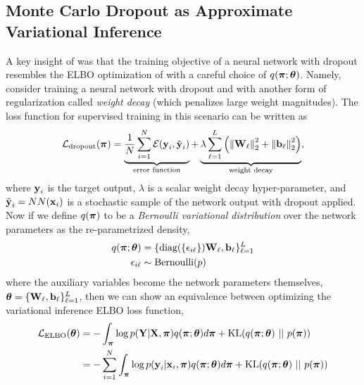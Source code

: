 \subsection{Monte Carlo Dropout as Approximate Variational Inference}
A key insight of \cite{Gal2016UncertaintyThesis, Gal2016-ny} was that the training objective of a neural network with dropout resembles the ELBO optimization of  with a careful choice of $q(\boldsymbol{\mathbf{\pi}}; \boldsymbol{\mathbf{\theta}})$.
Namely, consider training a neural network with dropout and with another form of regularization called \textit{weight decay} (which penalizes large weight magnitudes). The loss function for supervised training in this scenario can be written as
\begin{equation}
\label{eq:sun_bcnn_dropout_obj}
\mathcal{L}_{\text{dropout}}(\boldsymbol{\mathbf{\pi}}) = \underbrace{\frac{1}{N} \sum_{i=1}^N \mathcal{E}(\boldsymbol{\mathbf{y}}_i, \tilde{\boldsymbol{\mathbf{y}}}_i)}_{\text{error function}} + \underbrace{\lambda \sum_{\ell=1}^L	\left( \left\Vert\boldsymbol{\mathbf{W}}_\ell\right\Vert_2^2 +  \left\Vert\boldsymbol{\mathbf{b}}_\ell\right\Vert_2^2\right)}_{\text{weight decay}},
\end{equation}
where $\boldsymbol{\mathbf{y}}_i$ is the target output, $\lambda$ is a scalar weight decay hyper-parameter, and $\tilde{\boldsymbol{\mathbf{y}}}_i = NN(\boldsymbol{\mathbf{x}}_i)$ is a stochastic sample of the network output with dropout applied. Now if we define $q(\boldsymbol{\mathbf{\pi}})$ to be a \textit{Bernoulli variational distribution}  over the network parameters as the re-parametrized density,
\begin{align}
	q(\boldsymbol{\mathbf{\pi}}; \boldsymbol{\mathbf{\theta}}) &= \{\text{diag} (\{ \epsilon_{i\ell} \}) \boldsymbol{\mathbf{W}}_\ell, \boldsymbol{\mathbf{b}}_\ell\}_{\ell=1}^L \\
	\epsilon_{i\ell} &\sim \text{Bernoulli}(p) 
\end{align}
where the auxiliary variables become the network parameters themselves, $\boldsymbol{\mathbf{\theta}} = \{\boldsymbol{\mathbf{W}}_\ell, \boldsymbol{\mathbf{b}}_\ell\}_{\ell=1}^L$, then we can show an equivalence between optimizing the variational inference ELBO loss function,
\begin{align}
\mathcal{L}_{\text{ELBO}}(\boldsymbol{\mathbf{\theta}}) &= -\int_{\boldsymbol{\mathbf{\pi}}}  \log p(\boldsymbol{\mathbf{Y}} | \boldsymbol{\mathbf{X}}, \boldsymbol{\mathbf{\pi}})  q(\boldsymbol{\mathbf{\pi}}; \boldsymbol{\mathbf{\theta}}) d\boldsymbol{\mathbf{\pi}} +  \text{KL}(q(\boldsymbol{\mathbf{\pi}}; \boldsymbol{\mathbf{\theta}}) ~ || ~ p(\boldsymbol{\mathbf{\pi}}))\\
&= - \sum_{i=1}^N \int_{\boldsymbol{\mathbf{\pi}}}  \log p(\boldsymbol{\mathbf{y}}_i | \boldsymbol{\mathbf{x}}_i, \boldsymbol{\mathbf{\pi}})  q(\boldsymbol{\mathbf{\pi}}; \boldsymbol{\mathbf{\theta}}) d\boldsymbol{\mathbf{\pi}} + \text{KL}(q(\boldsymbol{\mathbf{\pi}}; \boldsymbol{\mathbf{\theta}}) ~ || ~ p(\boldsymbol{\mathbf{\pi}}))
\end{align}
